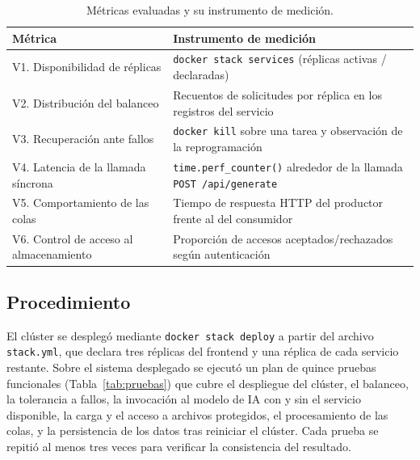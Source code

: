 \begin{table}[htbp]
  \centering
  \caption{Métricas evaluadas y su instrumento de medición.}
  \label{tab:metricas}
  \small
  \begin{tabular}{@{}p{4.3cm} p{7.7cm}@{}}
    \toprule
    \textbf{Métrica} & \textbf{Instrumento de medición} \\
    \midrule
    V1. Disponibilidad de réplicas & \texttt{docker stack services} (réplicas activas / declaradas) \\
    V2. Distribución del balanceo & Recuentos de solicitudes por réplica en los registros del servicio \\
    V3. Recuperación ante fallos & \texttt{docker kill} sobre una tarea y observación de la reprogramación \\
    V4. Latencia de la llamada síncrona & \texttt{time.perf\_counter()} alrededor de la llamada \texttt{POST /api/generate} \\
    V5. Comportamiento de las colas & Tiempo de respuesta HTTP del productor frente al del consumidor \\
    V6. Control de acceso al almacenamiento & Proporción de accesos aceptados/rechazados según autenticación \\
    \bottomrule
  \end{tabular}
\end{table}

\subsection{Procedimiento}

El clúster se desplegó mediante \texttt{docker stack deploy} a partir del
archivo \texttt{stack.yml}, que declara tres réplicas del frontend y una
réplica de cada servicio restante. Sobre el sistema desplegado se ejecutó un
plan de quince pruebas funcionales (Tabla~\ref{tab:pruebas}) que cubre el
despliegue del clúster, el balanceo, la tolerancia a fallos, la invocación al
modelo de IA con y sin el servicio disponible, la carga y el acceso a
archivos protegidos, el procesamiento de las colas, y la persistencia de los
datos tras reiniciar el clúster. Cada prueba se repitió al menos tres veces
para verificar la consistencia del resultado.

